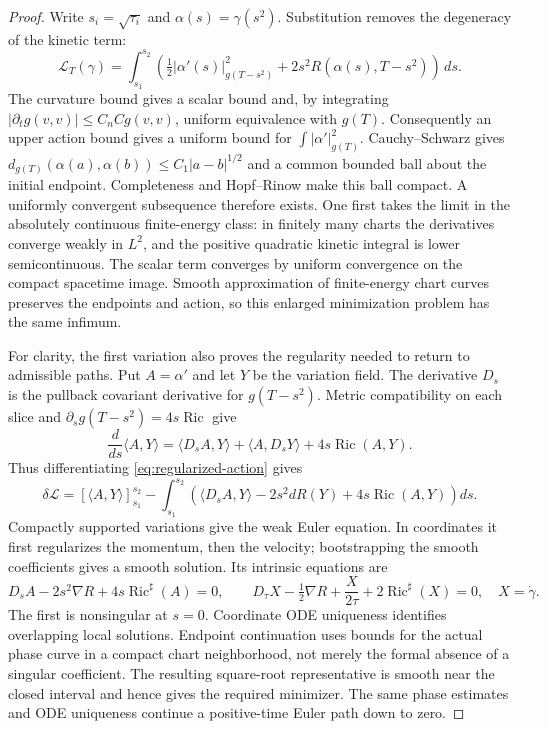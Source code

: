 \begin{proof}
Write $s_i=\sqrt{\tau_i}$ and $\alpha(s)=\gamma(s^2)$.  Substitution removes
the degeneracy of the kinetic term:
\begin{equation}\label{eq:regularized-action}
 \mathcal L_T(\gamma)=\int_{s_1}^{s_2}
 \left(\tfrac12|\alpha'(s)|_{g(T-s^2)}^2
             +2s^2R(\alpha(s),T-s^2)\right)\,ds.
\end{equation}
The curvature bound gives a scalar bound and, by integrating
$|\partial_tg(v,v)|\leq C_n Cg(v,v)$, uniform equivalence with $g(T)$.
Consequently an upper action bound gives a uniform bound for
$\int|\alpha'|_{g(T)}^2$.  Cauchy--Schwarz gives
$d_{g(T)}(\alpha(a),\alpha(b))\leq C_1|a-b|^{1/2}$ and a common bounded
ball about the initial endpoint.  Completeness and Hopf--Rinow make this
ball compact.  A uniformly convergent subsequence therefore exists.
One first takes the limit in the absolutely continuous finite-energy class:
in finitely many charts the derivatives converge weakly in $L^2$, and the
positive quadratic kinetic integral is lower semicontinuous.  The scalar
term converges by uniform convergence on the compact spacetime image.
Smooth approximation of finite-energy chart curves preserves the endpoints
and action, so this enlarged minimization problem has the same infimum.

For clarity, the first variation also proves the regularity needed to return
to admissible paths.  Put $A=\alpha'$ and let $Y$ be the variation field.
The derivative $D_s$ is the pullback covariant derivative for $g(T-s^2)$.
Metric compatibility on each slice and $\partial_sg(T-s^2)=4s\operatorname{Ric}$
give
\[
 \frac d{ds}\langle A,Y\rangle
 =\langle D_sA,Y\rangle+\langle A,D_sY\rangle
       +4s\operatorname{Ric}(A,Y).
\]
Thus differentiating \eqref{eq:regularized-action} gives
\begin{equation}\label{eq:first-variation}
 \delta\mathcal L=[\langle A,Y\rangle]_{s_1}^{s_2}
 -\int_{s_1}^{s_2}
 \left(\langle D_sA,Y\rangle-2s^2dR(Y)
                       +4s\operatorname{Ric}(A,Y)\right)ds.
\end{equation}
Compactly supported variations give the weak Euler equation.  In coordinates
it first regularizes the momentum, then the velocity; bootstrapping the
smooth coefficients gives a smooth solution.  Its intrinsic equations are
\[
 D_sA-2s^2\nabla R+4s\operatorname{Ric}^{\sharp}(A)=0,
 \qquad
 D_\tau X-\tfrac12\nabla R+\frac X{2\tau}
                  +2\operatorname{Ric}^{\sharp}(X)=0,
 \quad X=\dot\gamma.
\]
The first is nonsingular at $s=0$.  Coordinate ODE uniqueness identifies
overlapping local solutions.  Endpoint continuation uses bounds for the
actual phase curve in a compact chart neighborhood, not merely the formal
absence of a singular coefficient.  The resulting square-root representative
is smooth near the closed interval and hence gives the required minimizer.
The same phase estimates and ODE uniqueness continue a positive-time Euler
path down to zero.


\end{proof}

